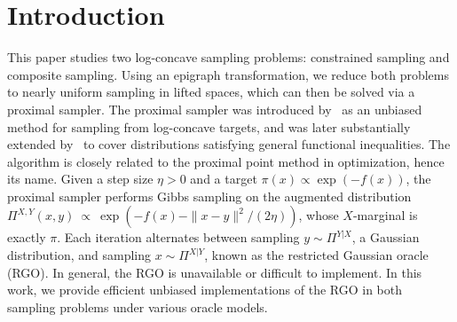 \documentclass[11pt,letterpaper]{article}
\begin{document}
\section{Introduction}
\label{sec:intro}



This paper studies two log-concave sampling problems: constrained sampling and composite sampling. Using an epigraph transformation, we reduce both problems to nearly uniform sampling in lifted spaces, which can then be solved via a proximal sampler.
The proximal sampler was introduced by~\cite{leestructured21} as an unbiased method for sampling from log-concave targets, and was later substantially extended by~\cite{chen2022improved} to cover distributions satisfying general functional inequalities. The algorithm is closely related to the proximal point method in optimization, hence its name. Given a step size $\eta>0$ and a target $\pi(x)\propto \exp(-f(x))$, the proximal sampler performs Gibbs sampling on the augmented distribution $\Pi^{X,Y}(x,y)\ \propto\ \exp\!\left(-f(x)-\|x-y\|^2/(2\eta)\right)$, whose $X$-marginal is exactly $\pi$. Each iteration alternates between sampling  $y \sim \Pi^{Y|X}$, a Gaussian distribution, and sampling $x\sim \Pi^{X|Y}$, known as the restricted Gaussian oracle (RGO). In general, the RGO is unavailable or difficult to implement. In this work, we provide efficient unbiased implementations of the RGO in both sampling problems under various oracle models.
\end{document}
